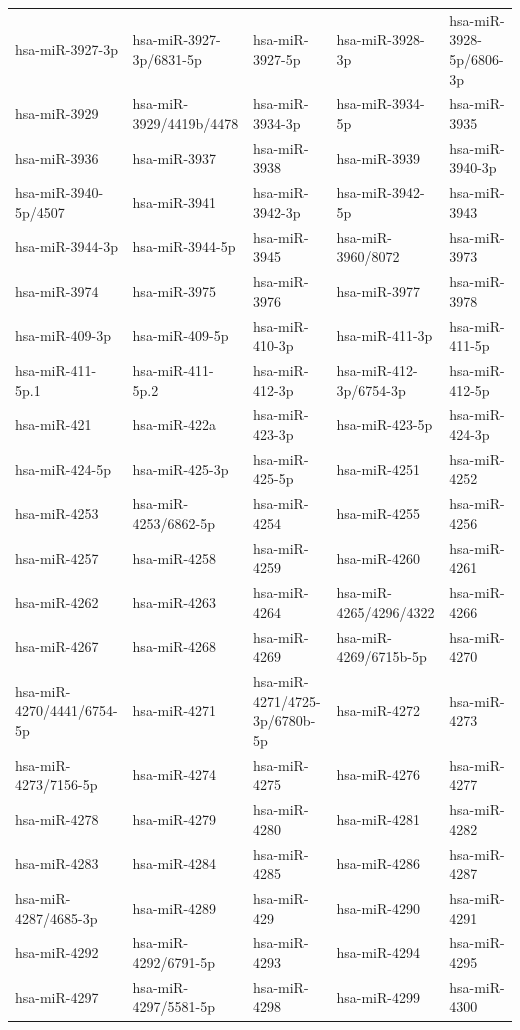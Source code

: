 \begin{longtable}{lllll}
hsa-miR-3927-3p & hsa-miR-3927-3p/6831-5p & hsa-miR-3927-5p & hsa-miR-3928-3p & hsa-miR-3928-5p/6806-3p \\
hsa-miR-3929 & hsa-miR-3929/4419b/4478 & hsa-miR-3934-3p & hsa-miR-3934-5p & hsa-miR-3935 \\
hsa-miR-3936 & hsa-miR-3937 & hsa-miR-3938 & hsa-miR-3939 & hsa-miR-3940-3p \\
hsa-miR-3940-5p/4507 & hsa-miR-3941 & hsa-miR-3942-3p & hsa-miR-3942-5p & hsa-miR-3943 \\
hsa-miR-3944-3p & hsa-miR-3944-5p & hsa-miR-3945 & hsa-miR-3960/8072 & hsa-miR-3973 \\
hsa-miR-3974 & hsa-miR-3975 & hsa-miR-3976 & hsa-miR-3977 & hsa-miR-3978 \\
hsa-miR-409-3p & hsa-miR-409-5p & hsa-miR-410-3p & hsa-miR-411-3p & hsa-miR-411-5p \\
hsa-miR-411-5p.1 & hsa-miR-411-5p.2 & hsa-miR-412-3p & hsa-miR-412-3p/6754-3p & hsa-miR-412-5p \\
hsa-miR-421 & hsa-miR-422a & hsa-miR-423-3p & hsa-miR-423-5p & hsa-miR-424-3p \\
hsa-miR-424-5p & hsa-miR-425-3p & hsa-miR-425-5p & hsa-miR-4251 & hsa-miR-4252 \\
hsa-miR-4253 & hsa-miR-4253/6862-5p & hsa-miR-4254 & hsa-miR-4255 & hsa-miR-4256 \\
hsa-miR-4257 & hsa-miR-4258 & hsa-miR-4259 & hsa-miR-4260 & hsa-miR-4261 \\
hsa-miR-4262 & hsa-miR-4263 & hsa-miR-4264 & hsa-miR-4265/4296/4322 & hsa-miR-4266 \\
hsa-miR-4267 & hsa-miR-4268 & hsa-miR-4269 & hsa-miR-4269/6715b-5p & hsa-miR-4270 \\
hsa-miR-4270/4441/6754-5p & hsa-miR-4271 & hsa-miR-4271/4725-3p/6780b-5p & hsa-miR-4272 & hsa-miR-4273 \\
hsa-miR-4273/7156-5p & hsa-miR-4274 & hsa-miR-4275 & hsa-miR-4276 & hsa-miR-4277 \\
hsa-miR-4278 & hsa-miR-4279 & hsa-miR-4280 & hsa-miR-4281 & hsa-miR-4282 \\
hsa-miR-4283 & hsa-miR-4284 & hsa-miR-4285 & hsa-miR-4286 & hsa-miR-4287 \\
hsa-miR-4287/4685-3p & hsa-miR-4289 & hsa-miR-429 & hsa-miR-4290 & hsa-miR-4291 \\
hsa-miR-4292 & hsa-miR-4292/6791-5p & hsa-miR-4293 & hsa-miR-4294 & hsa-miR-4295 \\
hsa-miR-4297 & hsa-miR-4297/5581-5p & hsa-miR-4298 & hsa-miR-4299 & hsa-miR-4300 \\

\end{longtable}
